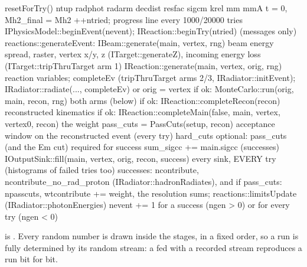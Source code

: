 \begin{simcplain}[basicstyle=\ttfamily\tiny]
resetForTry()                                   ntup radphot radarm decdist resfac sigcm krel mm mmA t = 0, Mh2_final = Mh2
++ntried; progress line every 1000/20000 tries
IPhysicsModel::beginEvent(nevent); IReaction::beginTry(ntried)      (messages only)
reactions::generateEvent:
   IBeam::generate(main, vertex, rng)           beam energy spread, raster, vertex x/y, z (ITarget::generateZ), incoming
                                                energy loss (ITarget::tripThruTarget arm 1)
   IReaction::generate(main, vertex, orig, rng) reaction variables; completeEv (tripThruTarget arms 2/3,
                                                IRadiator::initEvent); IRadiator::radiate(..., completeEv) or orig = vertex
if ok: MonteCarlo::run(orig, main, recon, rng)  both arms (below)
if ok: IReaction::completeRecon(recon)          reconstructed kinematics
if ok: IReaction::completeMain(false, main, vertex, vertex0, recon)  the weight
pass_cuts = PassCuts(setup, recon)              acceptance window on the reconstructed event (every try)
hard_cuts                                       optional: pass_cuts (and the Em cut) required for success
sum_sigcc += main.sigcc (successes)
IOutputSink::fill(main, vertex, orig, recon, success)   every sink, EVERY try (histograms of failed tries too)
successes: ncontribute, ncontribute_no_rad_proton (IRadiator::hadronRadiates), and if pass_cuts: npasscuts,
           wtcontribute += weight, the resolution sums; reactions::limitsUpdate (IRadiator::photonEnergies)
nevent += 1 for a success (ngen > 0) or for every try (ngen < 0)
\end{simcplain}
 is . Every random number is drawn inside the stages, in a fixed order, so a run is fully
determined by its random stream: a  fed with a recorded stream reproduces a run bit for bit.

